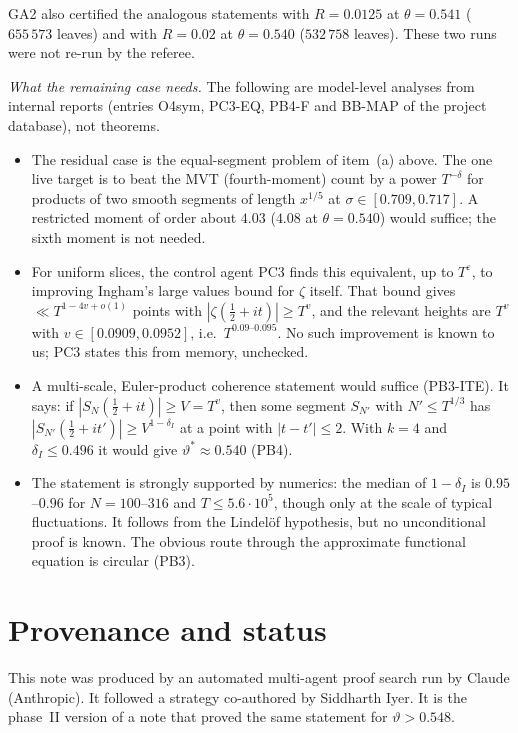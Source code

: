 \documentclass[11pt]{amsart}
\theoremstyle{definition}
\theoremstyle{remark}
\newcommand{\e}{\varepsilon}
\begin{document}
GA2 also certified the analogous statements with $R=0.0125$ at $\theta=0.541$ ($655\,573$ leaves) and with $R=0.02$ at $\theta=0.540$
($532\,758$ leaves). These two runs were not re-run by the referee.

\emph{What the remaining case needs.} The following are model-level analyses from internal reports (entries O4sym, PC3-EQ, PB4-F and BB-MAP
of the project database), not theorems.
\begin{itemize}[leftmargin=*]
\item The residual case is the equal-segment problem of item~(a) above. The one live target is to beat the MVT (fourth-moment) count by a power
$T^{-\delta}$ for products of two smooth segments of length $x^{1/5}$ at $\sigma\in[0.709,0.717]$. A restricted moment of order about $4.03$
($4.08$ at $\theta=0.540$) would suffice; the sixth moment is not needed.
\item For uniform slices, the control agent PC3 finds this equivalent, up to $T^{\e}$, to improving Ingham's large values bound for $\zeta$ itself.
That bound gives $\ll T^{1-4v+o(1)}$ points with $|\zeta(\frac12+it)|\ge T^{v}$, and the relevant heights are $T^{v}$ with $v\in[0.0909,0.0952]$, i.e.\
$T^{0.09\text{--}0.095}$. No such improvement is known to us; PC3 states this from memory, unchecked.
\item A multi-scale, Euler-product coherence statement would suffice (PB3-ITE). It says: if $|S_N(\frac12+it)|\ge V=T^{v}$, then some segment
$S_{N'}$ with $N'\le T^{1/3}$ has $|S_{N'}(\frac12+it')|\ge V^{1-\delta_I}$ at a point with $|t-t'|\le2$. With $k=4$ and $\delta_I\le0.496$ it would give
$\vartheta^*\approx0.540$ (PB4).
\item The statement is strongly supported by numerics: the median of $1-\delta_I$ is $0.95$--$0.96$ for $N=100$--$316$ and $T\le5.6\cdot10^5$, though
only at the scale of typical fluctuations. It follows from the Lindel\"of hypothesis, but no unconditional proof is known. The obvious route
through the approximate functional equation is circular (PB3).
\end{itemize}

\section{Provenance and status}\label{sec:prov}

This note was produced by an automated multi-agent proof search run by Claude (Anthropic). It followed a strategy
co-authored by Siddharth Iyer. It is the phase~II version of a note that proved the same statement for $\vartheta>0.548$.
\end{document}
